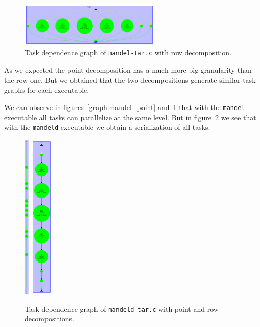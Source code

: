 \begin{figure}[H]
\centering
\includegraphics[width=0.6\textwidth]{plots/dependency_graph_mandel_row.pdf}
\caption{Task dependence graph of \texttt{mandel-tar.c} with row decomposition.}
\label{graph:mandel_row}
\end{figure}

As we expected the point decomposition has a much more big granularity than the row one. But we obtained that the two decompositions generate similar task graphs for each executable.

We can observe in figures~\ref{graph:mandel_point} and~\ref{graph:mandel_row} that with the \texttt{mandel} executable all tasks can parallelize at the same level. But in figure~\ref{graph:mandeld_point_and_row} we see that with the \texttt{mandeld} executable we obtain a serialization of all tasks.

\begin{figure}[H]
\centering
\includegraphics[height=8cm]{plots/dependency_graph_mandeld_point.png}
\hspace{5em}
\includegraphics[height=8cm]{plots/dependency_graph_mandeld_row.pdf}
\caption{Task dependence graph of \texttt{mandeld-tar.c} with point and row decompositions.}
\label{graph:mandeld_point_and_row}
\end{figure}

